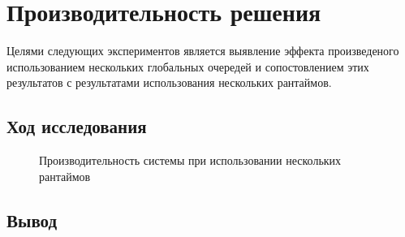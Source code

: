\section{Производительность решения}

Целями следующих экспериментов является выявление эффекта произведеного использованием нескольких глобальных очередей и сопостовлением этих результатов с результатами использования нескольких рантаймов.

\subsection{Ход исследования}

\begin{figure}[H]
    \begin{center}
    \end{center}

    \caption{Производительность системы при использовании нескольких рантаймов}
    \label{fig:tatlin:multi_rt:eval}
\end{figure}

\subsection{Вывод}


